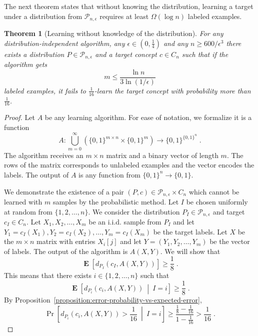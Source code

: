 \documentclass[11pt]{article}
\newtheorem{theorem}[proposition]{Theorem}
\renewcommand{\P}{\mathcal{P}}
\DeclareMathOperator{\Exp}{\mathbf{E}}
\begin{document}
The next theorem states that without knowing the distribution,
learning a target under a distribution from $\P_{n,\epsilon}$
requires at least $\Omega(\log n)$ labeled examples.

\begin{theorem}[Learning without knowledge of the distribution]
For any distribution-independent algorithm, any $\epsilon \in (0,\frac{1}{4})$ and any
$n \ge 600/\epsilon^3$ there exists a distribution $P \in \P_{n,\epsilon}$ and a target
concept $c \in C_n$ such that if the algorithm gets
$$
m \le \frac{\ln n}{3 \ln (1/\epsilon)}
$$
labeled examples, it fails to $\frac{1}{16}$-learn the target concept with probability
more than $\frac{1}{16}$.
\end{theorem}

\begin{proof}
Let $A$ be any learning algorithm. For ease of notation, we formalize it is a function
$$
A:\bigcup_{m=0}^\infty \left(\{0,1\}^{m \times n} \times \{0,1\}^m\right) \to \{0,1\}^{\{0,1\}^n} \; .
$$
The algorithm receives an $m \times n$ matrix and a binary vector of length $m$.
The rows of the matrix corresponds to unlabeled examples and the vector encodes
the labels. The output of $A$ is any function from $\{0,1\}^n \to \{0,1\}$.

We demonstrate the existence of a pair $(P,c) \in \P_{n,\epsilon} \times C_n$ which
cannot be learned with $m$ samples by the probabilistic method. Let $I$ be chosen
uniformly at random from $\{1,2,\dots,n\}$. We consider the distribution $P_I \in
\P_{n,\epsilon}$ and target $c_I \in C_n$. Let $X_1, X_2, \dots, X_m$ be an i.i.d.
sample from $P_I$ and let $Y_1 = c_I(X_1), Y_2 = c_I(X_2), \dots, Y_m =
c_I(X_m)$ be the target labels. Let $X$ be the $m \times n$ matrix with entries
$X_i[j]$ and let $Y = (Y_1, Y_2, \dots, Y_m)$ be the vector of labels. The
output of the algorithm is $A(X,Y)$. We will show that
\begin{equation}
\label{equation:projections-failure-probability}
\Exp \left[d_{P_I}(c_I, A(X,Y)) \right] \ge \frac{1}{8} \; .
\end{equation}
This means that there exists $i \in \{1,2,\dots,n\}$ such that
$$
\Exp \left[d_{P_i}(c_i, A(X,Y)) ~\middle|~ I = i \right] \ge \frac{1}{8} \; .
$$
By Proposition~\ref{proposition:error-probability-vs-expected-error},
$$
\Pr \left[ d_{P_i}(c_i, A(X,Y)) > \frac{1}{16} ~\middle|~ I = i \right] \ge \frac{\frac{1}{8} - \frac{1}{16}}{1 - \frac{1}{16}} > \frac{1}{16} \; .
$$


\end{proof}
\end{document}
